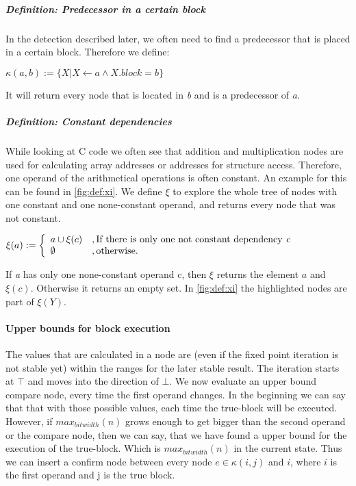 \subparagraph{Definition: Predecessor in a certain block}
In the detection described later, we often need to find a predecessor that is placed in a certain block. Therefore we define:
\begin{center}
$\kappa(a, b) := \{X| X \leftarrow a \wedge X.block = b \}$ 
\end{center}

It will return every node that is located in \textit{b} and is a predecessor of \textit{a}.

\subparagraph{Definition: Constant dependencies}

While looking at C code we often see that addition and multiplication nodes are used for calculating array addresses or addresses for structure access. Therefore, one operand of the arithmetical operations is often constant. An example for this can be found in \autoref{fig:def:xi}.
We define $\xi$ to explore the whole tree of nodes with one constant and one none-constant operand, and returns every node that was not constant.
\begin{center}
$\xi(a) := 
\left\{
	\begin{array}{l}
		a \cup \xi(c)\\ 
		\emptyset
	\end{array}
	\begin{array}{l}
		, \text{If there is only one not constant dependency \textit{c}} \\ 
		, \text{otherwise}.
	\end{array}
\right.$
\end{center}

If \textit{a} has only one none-constant operand c, then $\xi$ returns the element $a$ and $\xi(c)$. Otherwise it returns an empty set. In \autoref{fig:def:xi} the highlighted nodes are part of $\xi(Y)$.

\paragraph{Upper bounds for block execution}
The values that are calculated in a node are (even if the fixed point iteration is not stable yet) within the ranges for the later stable result. The iteration starts at $\top$ and moves into the direction of $\bot$. 
We now evaluate an upper bound compare node, every time the first operand changes. In the beginning we can say that that with those possible values, each time the true-block will be executed. However, if $max_{bitwidth}(n)$ grows enough to get bigger than the second operand or the compare node, then we can say, that we have found a upper bound for the execution of the true-block. Which is $max _{bitwidth}(n)$ in the current state. Thus we can insert a confirm node between every node $e \in \kappa(i, j)$ and $i$, where $i$ is the first operand and j is the true block.
\label{upper_bound_insert_confirm}


